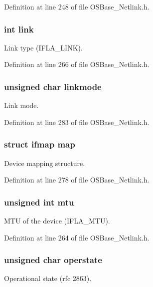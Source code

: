Definition at line 248 of file OSBase\_\-Netlink.h.\hypertarget{structnl_link_info_af203a1810ce3b44e2b2219c63e0ceff9}{
\subsubsection[{link}]{\setlength{\rightskip}{0pt plus 5cm}int {\bf link}}}
\label{structnl_link_info_af203a1810ce3b44e2b2219c63e0ceff9}
Link type (IFLA\_\-LINK). 

Definition at line 266 of file OSBase\_\-Netlink.h.\hypertarget{structnl_link_info_ac505421ab0f5f1cf48029ff5bd30554c}{
\subsubsection[{linkmode}]{\setlength{\rightskip}{0pt plus 5cm}unsigned char {\bf linkmode}}}
\label{structnl_link_info_ac505421ab0f5f1cf48029ff5bd30554c}
Link mode. 

Definition at line 283 of file OSBase\_\-Netlink.h.\hypertarget{structnl_link_info_a042d45afd6edfb21fcfc73235b695caa}{
\subsubsection[{map}]{\setlength{\rightskip}{0pt plus 5cm}struct ifmap {\bf map}}}
\label{structnl_link_info_a042d45afd6edfb21fcfc73235b695caa}
Device mapping structure. 

Definition at line 278 of file OSBase\_\-Netlink.h.\hypertarget{structnl_link_info_a5ac894ab93685970e62fbf6756f38309}{
\subsubsection[{mtu}]{\setlength{\rightskip}{0pt plus 5cm}unsigned int {\bf mtu}}}
\label{structnl_link_info_a5ac894ab93685970e62fbf6756f38309}
MTU of the device (IFLA\_\-MTU). 

Definition at line 264 of file OSBase\_\-Netlink.h.\hypertarget{structnl_link_info_a6389aebefc5f2ef983c0fccfbdb0e042}{
\subsubsection[{operstate}]{\setlength{\rightskip}{0pt plus 5cm}unsigned char {\bf operstate}}}
\label{structnl_link_info_a6389aebefc5f2ef983c0fccfbdb0e042}
Operational state (rfc 2863). 

